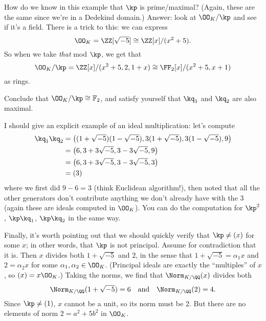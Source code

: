 How do we know in this example that $\kp$ is prime/maximal?
(Again, these are the same since we're in a Dedekind domain.)
Answer: look at $\OO_K / \kp$ and see if it's a field.
There is a trick to this: we can express
\[ \OO_K = \ZZ[\sqrt{-5}] \cong \ZZ[x] / (x^2+5). \]
So when we take \emph{that} mod $\kp$, we get that
\[ \OO_K / \kp = \ZZ[x] / (x^2+5, 2, 1+x) \cong \FF_2[x] / (x^2+5,x+1) \]
as rings.
\begin{ques}
	Conclude that $\OO_K / \kp \cong \mathbb F_2$,
	and satisfy yourself that $\kq_1$ and $\kq_2$ are also maximal.
\end{ques}
I should give an explicit example of an ideal multiplication: let's compute
\begin{align*}
	\kq_1\kq_2 &= \left( (1+\sqrt{-5})(1-\sqrt{-5}), 3(1+\sqrt{-5}), 3(1-\sqrt{-5}), 9 \right) \\
	&= \left( 6, 3+3\sqrt{-5}, 3-3\sqrt{-5}, 9 \right) \\
	&= \left( 6, 3+3\sqrt{-5}, 3-3\sqrt{-5}, 3 \right) \\
	&= (3)
\end{align*}
where we first did $9-6=3$ (think Euclidean algorithm!),
then noted that all the other generators don't contribute
anything we don't already have with the $3$
(again these are ideals computed in $\OO_K$).
You can do the computation for $\kp^2$, $\kp\kq_1$, $\kp\kq_2$ in the same way.

Finally, it's worth pointing out that we should quickly
verify that $\kp \neq (x)$ for some $x$;
in other words, that $\kp$ is not principal.
Assume for contradiction that it is.
Then $x$ divides both $1+\sqrt{-5}$ and $2$, in the sense
that $1+\sqrt{-5} = \alpha_1 x$ and $2 = \alpha_2 x$
for some $\alpha_1, \alpha_2 \in \OO_K$.
(Principal ideals are exactly the ``multiples'' of $x$, so $(x) = x \OO_K$.)
Taking the norms, we find that $\Norm_{K/\QQ}(x)$ divides both
\[ \Norm_{K/\QQ}(1+\sqrt{-5}) = 6 \quad\text{and}\quad \Norm_{K/\QQ}(2) = 4. \]
Since $\kp \neq (1)$, $x$ cannot be a unit, so its norm must be $2$.
But there are no elements of norm $2 = a^2+5b^2$ in $\OO_K$.

